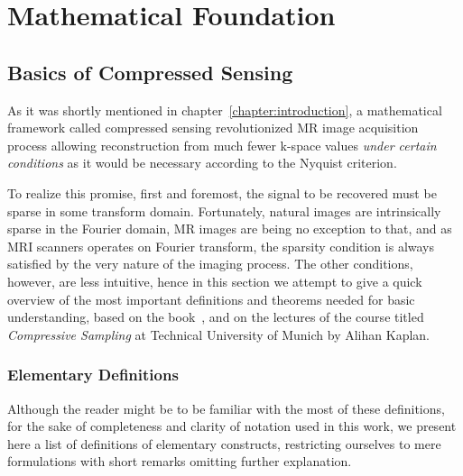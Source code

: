 \chapter{Mathematical Foundation}

\section{Basics of Compressed Sensing}
As it was shortly mentioned in chapter~\ref{chapter:introduction}, a mathematical framework called compressed sensing revolutionized MR image acquisition process allowing reconstruction from much fewer k-space values \textit{under certain conditions} as it would be necessary according to the Nyquist criterion.

To realize this promise, first and foremost, the signal to be recovered must be sparse in some transform domain. Fortunately, natural images are intrinsically sparse in the Fourier domain, MR images are being no exception to that, and as MRI scanners operates on Fourier transform, the sparsity condition is always satisfied by the very nature of the imaging process. The other conditions, however, are less intuitive, hence in this section we attempt to give a quick overview of the most important definitions and theorems needed for basic understanding, based on the book~\cite{foucart_mathematical_2013}, and on the lectures of the course titled \textit{Compressive Sampling} at Technical University of Munich by Alihan Kaplan.

\subsection{Elementary Definitions}

Although the reader might be to be familiar with the most of these definitions, for the sake of completeness and clarity of notation used in this work, we present here a list of definitions of elementary constructs, restricting ourselves to mere formulations with short remarks omitting further explanation.

